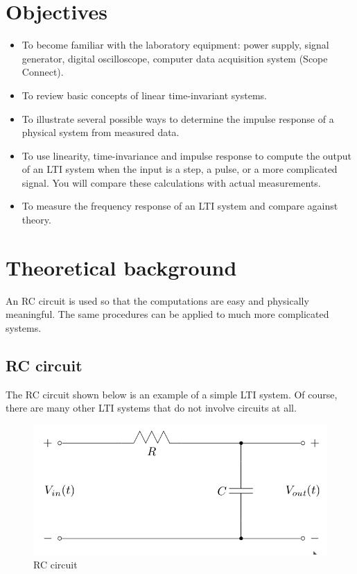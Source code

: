 \documentclass{article}
\begin{document}
\section{Objectives}
\begin{itemize}
	\item To become familiar with the laboratory equipment: power supply, signal generator, digital oscilloscope,
computer data acquisition system (Scope Connect).
	\item To review basic concepts of linear time-invariant systems.
	\item To illustrate several possible ways to determine the impulse response of a physical system from measured
data.
	\item To use linearity, time-invariance and impulse response to compute the output of an LTI system when
the input is a step, a pulse, or a more complicated signal. You will compare these calculations with
actual measurements.
	\item To measure the frequency response of an LTI system and compare against theory.
\end{itemize}

\section{Theoretical background}
An RC circuit is used so that the computations are easy and physically meaningful. The same procedures
can be applied to much more complicated systems.

\subsection{RC circuit}
The RC circuit shown below is an example of a simple LTI system. Of course, there are many other LTI
systems that do not involve circuits at all.

\begin{figure}[htbp]
	\centering
	\includegraphics[width=0.7\linewidth]{fig-1.png}
	\caption{RC circuit}
	\label{fig-setup}
\end{figure}
\end{document}
